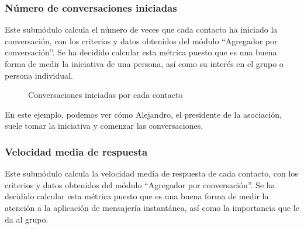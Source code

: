 \subsubsection{Número de conversaciones iniciadas}

Este submódulo calcula el número de veces que cada contacto ha iniciado la conversación, con los criterios y datos obtenidos del módulo ``Agregador por conversación''. Se ha decidido calcular esta métrica puesto que es una buena forma de medir la iniciativa de una persona, así como su interés en el grupo o persona individual.

\begin{figure}[H]
	\centering
	\qquad
	\caption{Conversaciones iniciadas por cada contacto}
	\label{fig:chap4:conversations_started}
\end{figure}

En este ejemplo, podemos ver cómo Alejandro, el presidente de la asociación, suele tomar la iniciativa y comenzar las conversaciones.


\subsubsection{Velocidad media de respuesta}

Este submódulo calcula la velocidad media de respuesta de cada contacto, con los criterios y datos obtenidos del módulo ``Agregador por conversación''. Se ha decidido calcular esta métrica puesto que es una buena forma de medir la atención a la aplicación de mensajería instantánea, así como la importancia que le da al grupo.

